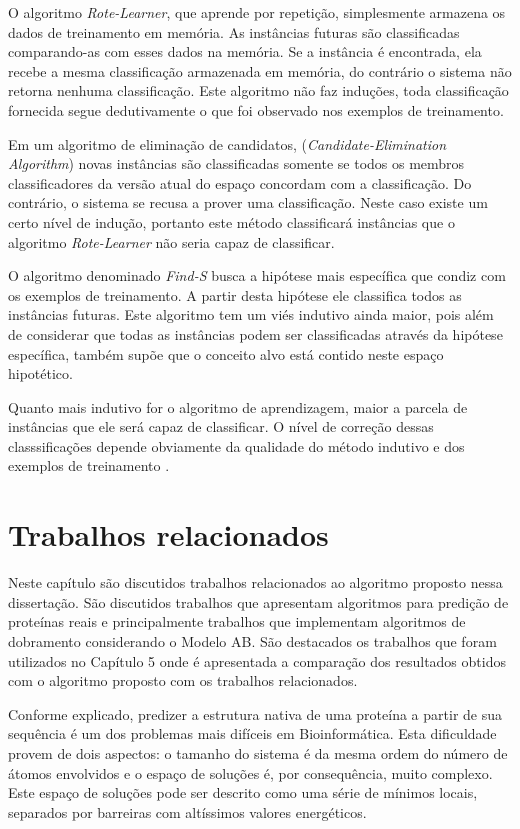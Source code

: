 \documentclass[dm,ppgcomp]{texfurg}
\begin{document}
O algoritmo {\it Rote-Learner}, que aprende por repetição, simplesmente armazena os dados de treinamento em memória. As instâncias futuras são classificadas comparando-as com esses dados na memória. Se a instância é encontrada, ela recebe a mesma classificação armazenada em memória, do contrário o sistema não retorna nenhuma classificação. Este algoritmo não faz induções, toda classificação fornecida segue dedutivamente o que foi observado nos exemplos de treinamento.

Em um algoritmo de eliminação de candidatos, ({\it Candidate-Elimination Algorithm}) novas instâncias são classificadas somente se todos os membros classificadores da versão atual do espaço concordam com a classificação. Do contrário, o sistema se recusa a prover uma classificação. Neste caso existe um certo nível de indução, portanto este método classificará instâncias que o algoritmo {\it Rote-Learner} não seria capaz de classificar. 

O algoritmo denominado {\it Find-S} busca a hipótese mais específica que condiz com os exemplos de treinamento. A partir desta hipótese ele classifica todos as instâncias futuras. Este algoritmo tem um viés indutivo ainda maior, pois além de considerar que todas as instâncias podem ser classificadas através da hipótese específica, também supõe que o conceito alvo está contido neste espaço hipotético.

Quanto mais indutivo for o algoritmo de aprendizagem, maior a parcela de instâncias que ele será capaz de classificar. O nível de correção dessas classsificações depende obviamente da qualidade do método indutivo e dos exemplos de treinamento \cite{anderson1986machine}.

\chapter{Trabalhos relacionados}

Neste capítulo são discutidos trabalhos relacionados ao algoritmo proposto nessa dissertação. São discutidos trabalhos que apresentam algoritmos para predição de proteínas reais e principalmente trabalhos que implementam algoritmos de dobramento considerando o Modelo AB. São destacados os trabalhos que foram utilizados no Capítulo 5 onde é apresentada a comparação dos resultados obtidos com o algoritmo proposto com os trabalhos relacionados. 

Conforme explicado, predizer a estrutura nativa de uma proteína a partir de sua sequência é um dos problemas mais difíceis em Bioinformática. Esta dificuldade provem de dois aspectos: o tamanho do sistema é da mesma ordem do número de átomos envolvidos e o espaço de soluções é, por consequência, muito complexo. Este espaço de soluções pode ser descrito como uma série de mínimos locais, separados por barreiras com altíssimos valores energéticos.
\end{document}
